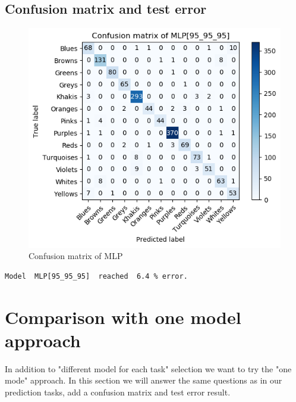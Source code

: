 \documentclass[12pt]{article}
\begin{document}
\newpage
\subsection{Confusion matrix and test error}
\begin{figure}[htp]
\centering
\includegraphics[width=\textwidth]{confusion_matrix/confusion_fig}
\caption{Confusion matrix of MLP}
\end{figure}

\begin{verbatim}
Model  MLP[95_95_95]  reached  6.4 % error.
\end{verbatim}

\newpage
\section{Comparison with one model approach}
In addition to "different model for each task" selection we want to try the "one mode" approach. In this section we will answer the same questions as in our prediction tasks, add a confusion matrix and test error result.
\end{document}
